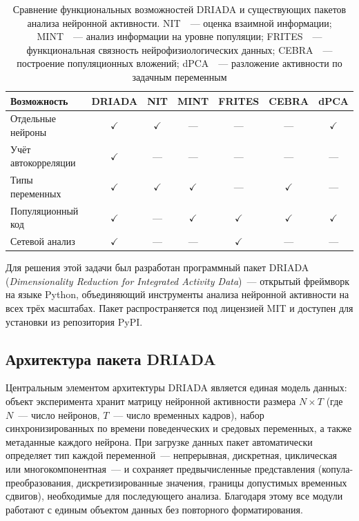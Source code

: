 \begin{table}[ht]
\centering
\caption{Сравнение функциональных возможностей DRIADA и существующих пакетов анализа нейронной активности. NIT~\cite{Maffulli2024}~--- оценка взаимной информации; MINT~\cite{Lorenz2025}~--- анализ информации на уровне популяции; FRITES~\cite{Combrisson2022}~--- функциональная связность нейрофизиологических данных; CEBRA~\cite{Schneider2023}~--- построение популяционных вложений; dPCA~\cite{Kobak2016}~--- разложение активности по задачным переменным}
\label{tab:driada_comparison}
\begin{tabular}{lcccccc}
\toprule
\textbf{Возможность} & \textbf{DRIADA} & \textbf{NIT} & \textbf{MINT} & \textbf{FRITES} & \textbf{CEBRA} & \textbf{dPCA} \\
\midrule
Отдельные нейроны        & $\checkmark$ & $\checkmark$ & ---          & ---          & ---          & $\checkmark$ \\
Учёт автокорреляции      & $\checkmark$ & ---          & ---          & ---          & ---          & ---          \\
Типы переменных          & $\checkmark$ & $\checkmark$ & $\checkmark$ & ---          & $\checkmark$ & ---          \\
Популяционный код        & $\checkmark$ & ---          & $\checkmark$ & $\checkmark$ & $\checkmark$ & $\checkmark$ \\
Сетевой анализ           & $\checkmark$ & ---          & ---          & $\checkmark$ & ---          & ---          \\
\bottomrule
\end{tabular}
\end{table}

Для решения этой задачи был разработан программный пакет DRIADA (\textit{Dimensionality Reduction for Integrated Activity Data})~--- открытый фреймворк на языке Python, объединяющий инструменты анализа нейронной активности на всех трёх масштабах. Пакет распространяется под лицензией MIT и доступен для установки из репозитория PyPI.


\subsection{Архитектура пакета DRIADA}

Центральным элементом архитектуры DRIADA является единая модель данных: объект эксперимента хранит матрицу нейронной активности размера $N \times T$ (где $N$~--- число нейронов, $T$~--- число временных кадров), набор синхронизированных по времени поведенческих и средовых переменных, а также метаданные каждого нейрона. При загрузке данных пакет автоматически определяет тип каждой переменной~--- непрерывная, дискретная, циклическая или многокомпонентная~--- и сохраняет предвычисленные представления (копула-преобразования, дискретизированные значения, границы допустимых временных сдвигов), необходимые для последующего анализа. Благодаря этому все модули работают с единым объектом данных без повторного форматирования.

